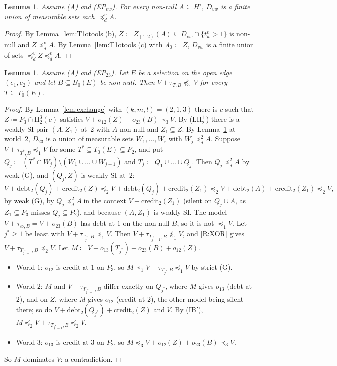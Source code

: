 \documentclass[11pt]{article}
\newtheorem{lemma}[theorem]{Lemma}
\theoremstyle{definition}\newtheorem{definition}[theorem]{Definition}
\theoremstyle{remark}\newtheorem{remark}[theorem]{Remark}
\newcommand{\debt}{\mathrm{debt}}
\newcommand{\cred}{\mathrm{credit}}
\newcommand{\Hi}[3]{\mathrm H^{#1}_{#2}(#3)}
\begin{document}
\begin{lemma}\label{lem:fineregion}
Assume (A) and (EP$_{vw}$). For every non-null $A\subseteq H'$, $D_{vw}$ is
a finite union of measurable sets each $\preceq^v_dA$.
\end{lemma}
\begin{proof}
By Lemma~\ref{lem:T1otools}(b), $Z\coloneqq Z_{(1,2)}(A)\subseteq
D_{vw}\cap\{t^v_w>1\}$ is non-null and $Z\preceq^v_dA$. By
Lemma~\ref{lem:T1otools}(c) with $A_0\coloneqq Z$, $D_{vw}$ is a finite union
of sets $\preceq^v_dZ\preceq^v_dA$.
\end{proof}

\begin{lemma}\label{lem:B2}
Assume (A) and (EP$_{23}$). Let $E$ be a selection on the open edge
$(e_1,e_2)$ and let $B\subseteq B_0(E)$ be non-null. Then
$V+\tau_{T,B}\not\preceq_1V$ for every $T\subseteq T_0(E)$.
\end{lemma}
\begin{proof}
By Lemma~\ref{lem:exchange} with $(k,m,l)=(2,1,3)$ there is $c$ such that
$Z\coloneqq P_3\cap\Hi32c$ satisfies $V+o_{12}(Z)+o_{23}(B)\prec_3V$. By
(LH$^+_2$) there is a weakly SI pair $(A,Z_1)$ at~$2$ with $A$ non-null and
$Z_1\subseteq Z$. By Lemma~\ref{lem:fineregion} at world~$2$, $D_{23}$ is a
union of measurable sets $W_1,\dots,W_r$ with $W_j\preceq^2_dA$. Suppose
$V+\tau_{T^*,B}\preceq_1V$ for some $T^*\subseteq T_0(E)\subseteq P_2$, and
put $Q_j\coloneqq(T^*\cap W_j)\setminus(W_1\cup\dots\cup W_{j-1})$ and
$T_j\coloneqq Q_1\cup\dots\cup Q_j$. Then $Q_j\preceq^2_dA$ by weak (G),
and $(Q_j,Z)$ is weakly SI at~$2$:
\[
 V+\debt_2(Q_j)+\cred_2(Z)\preceq_2V+\debt_2(Q_j)+\cred_2(Z_1)\preceq_2
 V+\debt_2(A)+\cred_2(Z_1)\preceq_2V,
\]
by weak (G), by $Q_j\preceq^2_dA$ in the context $V+\cred_2(Z_1)$ (silent
on $Q_j\cup A$, as $Z_1\subseteq P_3$ misses $Q_j\subseteq P_2$), and
because $(A,Z_1)$ is weakly SI. The model $V+\tau_{\varnothing,B}=
V+o_{23}(B)$ has debt at $1$ on the non-null $B$, so it is not $\preceq_1V$.
Let $j^*\ge1$ be least with $V+\tau_{T_{j^*},B}\preceq_1V$. Then
$V+\tau_{T_{j^*-1},B}\not\preceq_1V$, and \ref{R:XOR} gives
$V+\tau_{T_{j^*-1},B}\preceq_2V$. Let $M\coloneqq
V+o_{13}(T_{j^*})+o_{23}(B)+o_{12}(Z)$.
\begin{itemize}[leftmargin=*,itemsep=1pt]
\item World $1$: $o_{12}$ is credit at $1$ on $P_3$, so
$M\prec_1V+\tau_{T_{j^*},B}\preceq_1V$ by strict (G).
\item World $2$: $M$ and $V+\tau_{T_{j^*-1},B}$ differ exactly on $Q_{j^*}$,
where $M$ gives $o_{13}$ (debt at $2$), and on $Z$, where $M$ gives $o_{12}$
(credit at $2$), the other model being silent there; so do
$V+\debt_2(Q_{j^*})+\cred_2(Z)$ and $V$. By (IB$'$),
$M\preceq_2V+\tau_{T_{j^*-1},B}\preceq_2V$.
\item World $3$: $o_{13}$ is credit at $3$ on $P_2$, so
$M\preceq_3V+o_{12}(Z)+o_{23}(B)\prec_3V$.
\end{itemize}
So $M$ dominates $V$: a contradiction.
\end{proof}
\end{document}
